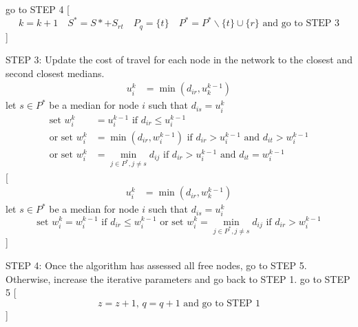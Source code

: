 \documentclass[11pt]{article}
\begin{document}
		\begin{algorithm}
			\begin{algorithmic}[0]
			\Statex	
			\Statex go to STEP 4
			[
			\begin{equation*}
			k = k+1 \quad  S^*= S* + S_{rt} \quad P_q = \{t\} \quad P^*= P^*\backslash \{t\} \cup \{r\} \text{ and  go to STEP 3}
			\end{equation*}				
			]
			\EndIf
				
			\Statex
			\Statex STEP 3: Update the cost of travel for each node in the network to the closest and second closest medians.
			\begin{align*}
			u_i^k & = \min(d_{ir},u_k^{k-1})
			\end{align*}
			\Statex let $s \in P^*$ be a median for node $i$ such that $d_{is} = u_i^k$
			\begin{align*}
			\text{set } w_i^k & = u_i^{k-1} \text{ if } d_{ir} \leq u_i^{k-1}\\
			\text{or set } w_i^k & = \min(d_{ir},w_i^{k-1}) \text{ if } d_{ir} > u_i^{k-1} \text{ and } d_{it} > w_i^{k-1}\\
			\text{or set } w_i^k & = \min_{j\in P^*,j\neq s}d_{ij} \text{ if } d_{ir} > u_i^{k-1} \text{ and } d_{it} = w_i^{k-1}
			\end{align*}
			[
			\begin{align*}
			u_i^k & = \min(d_{ir},w_k^{k-1})
			\end{align*}
			\Statex let $s \in P^*$ be a median for node $i$ such that $d_{is} = u_i^k$
			\begin{equation*}
			\text{set } w_i^k  = w_i^{k-1} \text{ if } d_{ir} \leq w_i^{k-1}
			\text{ or set } w_i^k = \min_{j\in P^*,j\neq s}d_{ij} \text{ if }d_{ir} > w_i^{k-1}
			\end{equation*}
			]
			\EndIf			
			
			
			\Statex
			\Statex STEP 4: Once the algorithm has assessed all free nodes, go to STEP 5. Otherwise, increase the iterative parameters and go back to STEP 1.
			\Statex go to STEP 5
			[
			\begin{equation*}
			z=z+1 \text{, } q=q+1 \text{ and go to STEP 1}
			\end{equation*}
			]
			\EndIf
			
				\Statex	
			\end{algorithmic}
		\end{algorithm}
				
\end{document}

